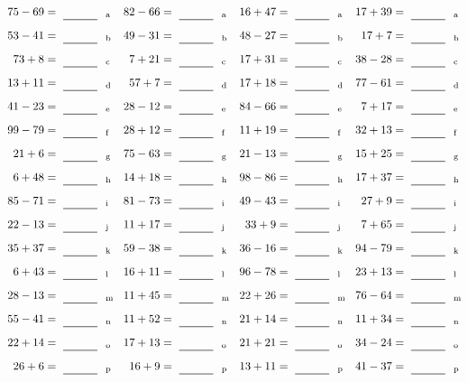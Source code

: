 \documentclass
[
  draft    = true,
  fontsize = 11pt,
  parskip  = half-
]
{scrartcl}
\begin{document}
\clearpage
\begin{align*}
    \pline{75-69}&=\rline{a}
  & \pline{82-66}&=\rline{a}
  & \pline{16+47}&=\rline{a}
  & \pline{17+39}&=\rline{a} \\[1ex]
    \pline{53-41}&=\rline{b}
  & \pline{49-31}&=\rline{b}
  & \pline{48-27}&=\rline{b}
  & \pline{17+7}&=\rline{b} \\[1ex]
    \pline{73+8}&=\rline{c}
  & \pline{7+21}&=\rline{c}
  & \pline{17+31}&=\rline{c}
  & \pline{38-28}&=\rline{c} \\[1ex]
    \pline{13+11}&=\rline{d}
  & \pline{57+7}&=\rline{d}
  & \pline{17+18}&=\rline{d}
  & \pline{77-61}&=\rline{d} \\[1ex]
    \pline{41-23}&=\rline{e}
  & \pline{28-12}&=\rline{e}
  & \pline{84-66}&=\rline{e}
  & \pline{7+17}&=\rline{e} \\[1ex]
    \pline{99-79}&=\rline{f}
  & \pline{28+12}&=\rline{f}
  & \pline{11+19}&=\rline{f}
  & \pline{32+13}&=\rline{f} \\[1ex]
    \pline{21+6}&=\rline{g}
  & \pline{75-63}&=\rline{g}
  & \pline{21-13}&=\rline{g}
  & \pline{15+25}&=\rline{g} \\[1ex]
    \pline{6+48}&=\rline{h}
  & \pline{14+18}&=\rline{h}
  & \pline{98-86}&=\rline{h}
  & \pline{17+37}&=\rline{h} \\[1ex]
    \pline{85-71}&=\rline{i}
  & \pline{81-73}&=\rline{i}
  & \pline{49-43}&=\rline{i}
  & \pline{27+9}&=\rline{i} \\[1ex]
    \pline{22-13}&=\rline{j}
  & \pline{11+17}&=\rline{j}
  & \pline{33+9}&=\rline{j}
  & \pline{7+65}&=\rline{j} \\[1ex]
    \pline{35+37}&=\rline{k}
  & \pline{59-38}&=\rline{k}
  & \pline{36-16}&=\rline{k}
  & \pline{94-79}&=\rline{k} \\[1ex]
    \pline{6+43}&=\rline{l}
  & \pline{16+11}&=\rline{l}
  & \pline{96-78}&=\rline{l}
  & \pline{23+13}&=\rline{l} \\[1ex]
    \pline{28-13}&=\rline{m}
  & \pline{11+45}&=\rline{m}
  & \pline{22+26}&=\rline{m}
  & \pline{76-64}&=\rline{m} \\[1ex]
    \pline{55-41}&=\rline{n}
  & \pline{11+52}&=\rline{n}
  & \pline{21+14}&=\rline{n}
  & \pline{11+34}&=\rline{n} \\[1ex]
    \pline{22+14}&=\rline{o}
  & \pline{17+13}&=\rline{o}
  & \pline{21+21}&=\rline{o}
  & \pline{34-24}&=\rline{o} \\[1ex]
    \pline{26+6}&=\rline{p}
  & \pline{16+9}&=\rline{p}
  & \pline{13+11}&=\rline{p}
  & \pline{41-37}&=\rline{p}
\end{align*}
\end{document}
